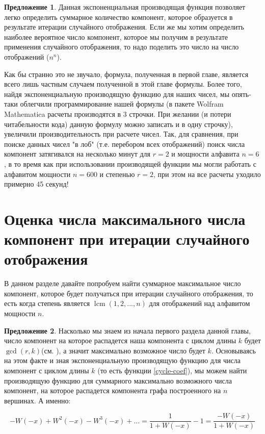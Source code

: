 \documentclass[10pt, a4paper]{report}
\theoremstyle{definition}
\newtheorem{remark}{Предложение}[chapter]
\DeclareMathOperator{\lcm}{lcm}
\begin{document}
\begin{remark}
	Данная экспоненциальная производящая функция позволяет легко определить суммарное количество компонент, которое образуется в результате итерации случайного отображения. Если же мы хотим определить наиболее вероятное число компонент, которое мы получим в результате применения случайного отображения, то надо поделить это число на число отображений ($n^n$). 
\end{remark}

Как бы странно это не звучало, формула, полученная в первой главе, является всего лишь частным случаем полученной в этой главе формулы. Более того, найдя экспоненциальную производящую функцию для наших чисел, мы опять-таки облегчили программирование нашей формулы (в пакете Wolfram Mathematica расчеты производятся в 3 строчки. При желании (и потери читабельности кода) данную формулу можно записать и в одну строчку), увеличили производительность при расчете чисел. Так, для сравнения, при поиске данных чисел "в лоб" (т.е. перебором всех отображений) поиск числа компонент затягивался на несколько минут для $r=2$ и мощности алфавита $n=6$, в то время как при использовании производящей функции мы могли работать с алфавитом мощности $n=600$ и степенью $r=2$, при этом на все расчеты уходило примерно 45 секунд!

\section{Оценка числа максимального числа компонент при итерации случайного отображения}

В данном разделе давайте попробуем найти суммарное максимальное число компонент, которое будет получаться при итерации случайного отображения, то есть когда степень является $\lcm(1,2,...,n)$ для отображений над алфавитом мощности $n$.

\begin{remark}
Насколько мы знаем из начала первого раздела данной главы, число компонент на которое распадется наша компонента с циклом длины $k$ будет $\gcd(r,k)$(см. ), а значит максимально возможное число будет $k$. Основываясь на этом факте и зная экспоненциальную производящую функцию для числа компонент с циклом длины $k$ (то есть функции \eqref{cycle-coef}), мы можем найти производящую функцию для суммарного максимально возможного числа компонент, на которое распадется компонента графа построенного на $n$ вершинах. А именно:

$$
-W(-x) +  W^2(-x) - W^3(-x) + ... = \frac{1}{1+W(-x)} - 1 = \frac{-W(-x)}{1+W(-x)}
$$
\end{remark}
\end{document}
